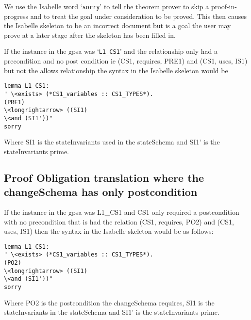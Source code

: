 We use the Isabelle word `\texttt{sorry}' to tell the theorem prover to skip a
proof-in-progress and to treat the goal under consideration to be proved. This
then causes the Isabelle skeleton to be an incorrect document but is a goal the
user may prove at a later stage after the skeleton has been filled in.

If the instance in the \gls{gpsa} was `\texttt{L1\_CS1}' and the relationship
only had a precondition and no post condition ie (CS1, requires, PRE1) and (CS1,
uses, IS1) but not the allows relationship the syntax in the Isabelle skeleton
would be 

\begin{verbatim}
lemma L1_CS1:
" \<exists> (*CS1_variables :: CS1_TYPES*).
(PRE1)
\<longrightarrow> ((SI1)
\<and (SI1'))"
sorry
\end{verbatim}

Where SI1 is the stateInvariants used in the stateSchema and SI1' is the
stateInvariants prime.

\subsection{Proof Obligation translation where the changeSchema has only postcondition}

If the instance in the \gls{gpsa} was L1\_CS1 and CS1 only required a
postcondition with no precondition that is had the relation (CS1, requires, PO2)
and (CS1, uses, IS1) then the syntax in the Isabelle skeleton would be as
follows:

\begin{verbatim}
lemma L1_CS1:
" \<exists> (*CS1_variables :: CS1_TYPES*).
(PO2)
\<longrightarrow> ((SI1)
\<and (SI1'))"
sorry
\end{verbatim}

Where PO2 is the postcondition the changeSchema requires, SI1 is the
stateInvariants in the stateSchema and SI1' is the stateInvariants prime. 



